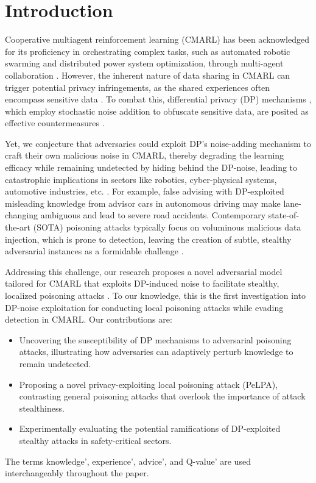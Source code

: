 \section{Introduction} \label{s:Introduction}

Cooperative multiagent reinforcement learning (CMARL) has been acknowledged for its proficiency in orchestrating complex tasks, such as automated robotic swarming and distributed power system optimization, through multi-agent collaboration \cite{Zhou2022,da2017simultaneously,le2017coordinated}. However, the inherent nature of data sharing in CMARL can trigger potential privacy infringements, as the shared experiences often encompass sensitive data \cite{li2022privacy,zou2020privacy}. To combat this, differential privacy (DP) mechanisms \cite{dwork2006}, which employ stochastic noise addition to obfuscate sensitive data, are posited as effective countermeasures \cite{li2022privacy,ye2022differential, Abahussein2023,ye2022one}.

Yet, we conjecture that adversaries could exploit DP's noise-adding mechanism to craft their own malicious noise in CMARL, thereby degrading the learning efficacy while remaining undetected by hiding behind the DP-noise, leading to catastrophic implications in sectors like robotics, cyber-physical systems, automotive industries, etc. \cite{scheikl2021cooperative,la2014multirobot,prasad2019multi,kiran2021deep}. For example, false advising with DP-exploited misleading knowledge from advisor cars in autonomous driving may make lane-changing ambiguous and lead to severe road accidents. Contemporary state-of-the-art (SOTA) poisoning attacks typically focus on voluminous malicious data injection, which is prone to detection, leaving the creation of subtle, stealthy adversarial instances as a formidable challenge \cite{cao2021data,fang2020local, mohammadi2023implicit,cheu2021manipulation}.

Addressing this challenge, our research proposes a novel adversarial model tailored for CMARL that exploits DP-induced noise to facilitate stealthy, localized poisoning attacks \cite{Hossain2021Desmp,giraldo2020adversarial,hossain2022adversarial}. To our knowledge, this is the first investigation into DP-noise exploitation for conducting local poisoning attacks while evading detection in CMARL. Our contributions are:

\begin{itemize}
\item Uncovering the susceptibility of DP mechanisms to adversarial poisoning attacks, illustrating how adversaries can adaptively perturb knowledge to remain undetected.
\item Proposing a novel privacy-exploiting local poisoning attack (PeLPA), contrasting general poisoning attacks that overlook the importance of attack stealthiness.
\item Experimentally evaluating the potential ramifications of DP-exploited stealthy attacks in safety-critical sectors.
\end{itemize}

The terms knowledge', experience', advice', and Q-value' are used interchangeably throughout the paper.
